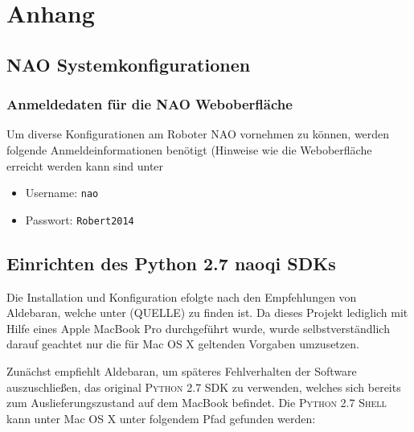 \section{Anhang}
	\label{anhangmin:Anhang}

\secttoc

\subsection{NAO Systemkonfigurationen}
	\label{anhangmin:NAOSyskonfig}

\subsubsection{Anmeldedaten für die NAO Weboberfläche}

Um diverse Konfigurationen am Roboter NAO vornehmen zu können, werden folgende Anmeldeinformationen benötigt (Hinweise wie die Weboberfläche erreicht werden kann sind unter 




\begin{itemize}
	\item Username: \texttt{nao}
	\item	Passwort: \texttt{Robert2014}
\end{itemize} 


\subsection{Einrichten des Python 2.7 naoqi SDKs}

Die Installation und Konfiguration efolgte nach den Empfehlungen von Aldebaran, welche unter (QUELLE) zu finden ist.
Da dieses Projekt lediglich mit Hilfe eines Apple MacBook Pro durchgeführt wurde, wurde selbstverständlich darauf geachtet nur die für Mac OS X geltenden Vorgaben umzusetzen.

Zunächst empfiehlt Aldebaran, um späteres Fehlverhalten der Software auszuschließen, das original \textsc{Python 2.7 SDK} zu verwenden, welches sich bereits zum Auslieferungszustand auf dem MacBook befindet.
Die \textsc{Python 2.7 Shell} kann unter Mac OS X unter folgendem Pfad gefunden werden:

